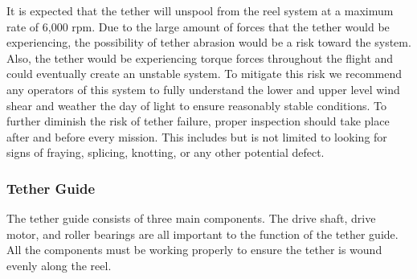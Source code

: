 \indent\indent It is expected that the tether will unspool from the reel system at a maximum rate of 6,000 rpm. Due to the large amount of forces that the tether would be experiencing, the possibility of tether abrasion would be a risk toward the system. Also, the tether would be experiencing torque forces throughout the flight and could eventually create an unstable system. To mitigate this risk we recommend any operators of this system to fully understand the lower and upper level wind shear and weather the day of light to ensure reasonably stable conditions. To further diminish the risk of tether failure, proper inspection should take place after and before every mission. This includes but is not limited to looking for signs of fraying, splicing, knotting, or any other potential defect.

\subsubsection{Tether Guide}

\indent\indent The tether guide consists of three main components. The drive shaft, drive motor, and roller bearings are all important to the function of the tether guide. All the components must be working properly to ensure the tether is wound evenly along the reel.

\begin{table}[H]
\caption{\label{tab:tether_guide} Tether Guide Failure Modes \& Probabilities}
\centering

\end{table}

